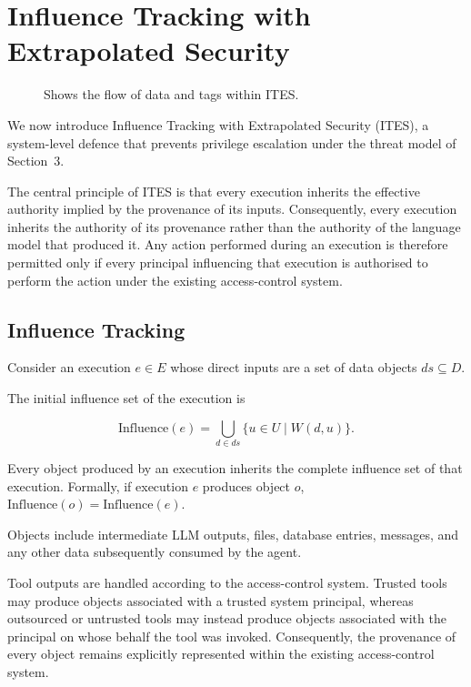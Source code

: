 \documentclass{article} %
\begin{document}
\section{Influence Tracking with Extrapolated Security}

\begin{figure}
  
  \caption{Shows the flow of data and tags within ITES.}
\end{figure}

We now introduce Influence Tracking with Extrapolated Security (ITES), a system-level defence that prevents privilege escalation under the threat model of Section~3.

The central principle of ITES is that every execution inherits the effective authority implied by the provenance of its inputs. Consequently, every execution inherits the authority of its provenance rather than the authority of the language model that produced it. Any action performed during an execution is therefore permitted only if every principal influencing that execution is authorised to perform the action under the existing access-control system.

\subsection{Influence Tracking}

Consider an execution
\(e\in E\)
whose direct inputs are a set of data objects
\(
ds\subseteq D.
\)

The initial influence set of the execution is

\[
\mathrm{Influence}(e)
=
\bigcup_{d\in ds}
\{u\in U\mid W(d,u)\}.
\]

Every object produced by an execution inherits the complete influence set of that execution. Formally, if execution \(e\) produces object \(o\), \(\mathrm{Influence}(o)=\mathrm{Influence}(e).\)

Objects include intermediate LLM outputs, files, database entries, messages, and any other data subsequently consumed by the agent.

Tool outputs are handled according to the access-control system. Trusted tools may produce objects associated with a trusted system principal, whereas outsourced or untrusted tools may instead produce objects associated with the principal on whose behalf the tool was invoked. Consequently, the provenance of every object remains explicitly represented within the existing access-control system.
\end{document}
